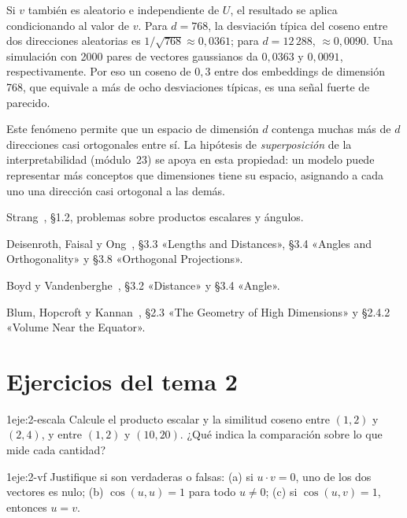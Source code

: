 Si $v$ también es aleatorio e independiente de $U$, el resultado se aplica condicionando al valor de $v$. Para $d=768$, la desviación típica del coseno entre dos direcciones aleatorias es $1/\sqrt{768}\approx 0{,}0361$; para $d=12\,288$, $\approx 0{,}0090$. Una simulación con 2000 pares de vectores gaussianos da $0{,}0363$ y $0{,}0091$, respectivamente. Por eso un coseno de $0{,}3$ entre dos embeddings de dimensión 768, que equivale a más de ocho desviaciones típicas, es una señal fuerte de parecido.

\begin{observacion}
Este fenómeno permite que un espacio de dimensión $d$ contenga muchas más de $d$ direcciones casi ortogonales entre sí. La hipótesis de \emph{superposición} de la interpretabilidad (módulo~23) se apoya en esta propiedad: un modelo puede representar más conceptos que dimensiones tiene su espacio, asignando a cada uno una dirección casi ortogonal a las demás.
\end{observacion}

\begin{lecturas}
\item Strang~\cite{strang}, §1.2, problemas sobre productos escalares y ángulos.
\item Deisenroth, Faisal y Ong~\cite{mml}, §3.3 «Lengths and Distances», §3.4 «Angles and Orthogonality» y §3.8 «Orthogonal Projections».
\item Boyd y Vandenberghe~\cite{vmls}, §3.2 «Distance» y §3.4 «Angle».
\item Blum, Hopcroft y Kannan~\cite{bhk}, §2.3 «The Geometry of High Dimensions» y §2.4.2 «Volume Near the Equator».
\end{lecturas}

\section*{Ejercicios del tema 2}

\begin{ejercicio}{1}{eje:2-escala}
Calcule el producto escalar y la similitud coseno entre $(1,2)$ y $(2,4)$, y entre $(1,2)$ y $(10,20)$. ¿Qué indica la comparación sobre lo que mide cada cantidad?
\end{ejercicio}

\begin{ejercicio}{1}{eje:2-vf}
Justifique si son verdaderas o falsas: (a) si $u\cdot v=0$, uno de los dos vectores es nulo; (b) $\cos(u,u)=1$ para todo $u\neq 0$; (c) si $\cos(u,v)=1$, entonces $u=v$.
\end{ejercicio}

